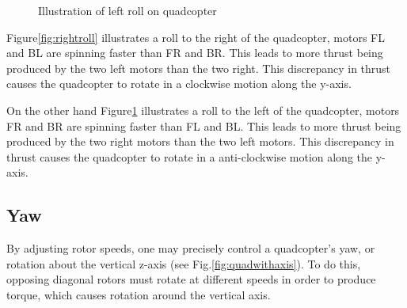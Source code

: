 \documentclass{report}
\begin{document}
\begin{figure}[H]
\begin{minipage}{.5\textwidth}
    \caption{Illustration of left roll on quadcopter}
    \label{fig:leftroll}
  \end{minipage}
\end{figure}

Figure\ref{fig:rightroll} illustrates a roll to the right of the quadcopter,
motors FL and BL are spinning faster than FR and BR. This leads to more thrust
being produced by the two left motors than the two right. This discrepancy in
thrust causes the quadcopter to rotate in a clockwise motion along the y-axis.

On the other hand Figure\ref{fig:leftroll} illustrates a roll to the left of the
quadcopter, motors FR and BR are spinning faster than FL and BL. This leads to
more thrust being produced by the two right motors than the two left motors.
This discrepancy in thrust causes the quadcopter to rotate in a anti-clockwise
motion along the y-axis.

\subsection{Yaw}
By adjusting rotor speeds, one may precisely control a quadcopter's yaw, or
rotation about the vertical z-axis (see Fig.\ref{fig:quadwithaxis}). To do this,
opposing diagonal rotors must rotate at different speeds in order to produce
torque, which causes rotation around the vertical axis.
\end{document}
